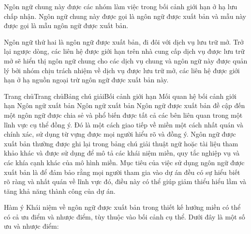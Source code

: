 Ngôn ngữ chung này được các nhóm làm việc trong bối cảnh giới hạn ở hạ lưu chấp nhận. Ngôn ngữ chung này được gọi là ngôn ngữ được xuất bản và mẫu này được gọi là mẫu ngôn ngữ được xuất bản.


Ngôn ngữ thứ hai là ngôn ngữ được xuất bản, đi đôi với dịch vụ lưu trữ mở. Trở lại ngược dòng, các liên hệ được giới hạn trên nhà cung cấp dịch vụ được lưu trữ mở sẽ hiển thị ngôn ngữ chung cho các dịch vụ chung và ngôn ngữ này được quản lý bởi nhóm chịu trách nhiệm về dịch vụ được lưu trữ mở, các liên hệ được giới hạn ở hạ nguồn ngoại trừ ngôn ngữ được xuất bản này.



Trang chủTrang chủBảng chú giảiBối cảnh giới hạn Mối quan hệ bối cảnh giới hạn Ngôn ngữ xuất bản
Ngôn ngữ xuất bản
Ngôn ngữ được xuất bản đề cập đến một ngôn ngữ được chia sẻ và phổ biến được tất cả các bên liên quan trong một lĩnh vực cụ thể đồng ý. Đó là một cách giao tiếp về miền một cách nhất quán và chính xác, sử dụng từ vựng được mọi người hiểu rõ và đồng ý. Ngôn ngữ được xuất bản thường được ghi lại trong bảng chú giải thuật ngữ hoặc tài liệu tham khảo khác và được sử dụng để mô tả các khái niệm miền, quy tắc nghiệp vụ và các khía cạnh khác của mô hình miền. Mục tiêu của việc sử dụng ngôn ngữ được xuất bản là để đảm bảo rằng mọi người tham gia vào dự án đều có sự hiểu biết rõ ràng và nhất quán về lĩnh vực đó, điều này có thể giúp giảm thiểu hiểu lầm và tăng khả năng thành công của dự án.

Hàm ý
Khái niệm về ngôn ngữ được xuất bản trong thiết kế hướng miền có thể có cả ưu điểm và nhược điểm, tùy thuộc vào bối cảnh cụ thể. Dưới đây là một số ưu và nhược điểm:

